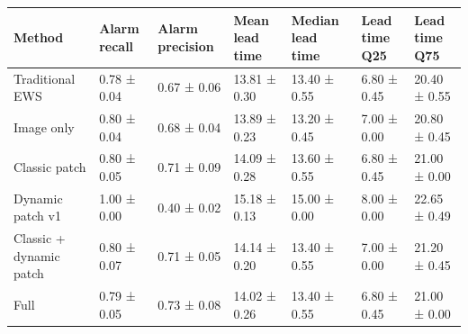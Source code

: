 \begin{tabular}{lllllll}
\toprule
Method & Alarm recall & Alarm precision & Mean lead time & Median lead time & Lead time Q25 & Lead time Q75 \\
\midrule
Traditional EWS & 0.78 ± 0.04 & 0.67 ± 0.06 & 13.81 ± 0.30 & 13.40 ± 0.55 & 6.80 ± 0.45 & 20.40 ± 0.55 \\
Image only & 0.80 ± 0.04 & 0.68 ± 0.04 & 13.89 ± 0.23 & 13.20 ± 0.45 & 7.00 ± 0.00 & 20.80 ± 0.45 \\
Classic patch & 0.80 ± 0.05 & 0.71 ± 0.09 & 14.09 ± 0.28 & 13.60 ± 0.55 & 6.80 ± 0.45 & 21.00 ± 0.00 \\
Dynamic patch v1 & 1.00 ± 0.00 & 0.40 ± 0.02 & 15.18 ± 0.13 & 15.00 ± 0.00 & 8.00 ± 0.00 & 22.65 ± 0.49 \\
Classic + dynamic patch & 0.80 ± 0.07 & 0.71 ± 0.05 & 14.14 ± 0.20 & 13.40 ± 0.55 & 7.00 ± 0.00 & 21.20 ± 0.45 \\
Full & 0.79 ± 0.05 & 0.73 ± 0.08 & 14.02 ± 0.26 & 13.40 ± 0.55 & 6.80 ± 0.45 & 21.00 ± 0.00 \\
\bottomrule
\end{tabular}

